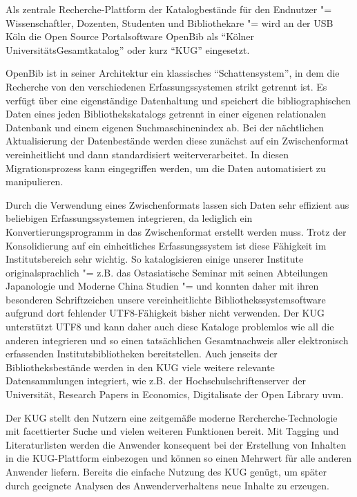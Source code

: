 \documentclass[11pt]{scrartcl}
\begin{document}
Als zentrale Recherche-Plattform der Katalogbestände für den Endnutzer
"= Wissenschaftler, Dozenten, Studenten und Bibliothekare "= wird an
der USB Köln die Open Source Portalsoftware OpenBib\cite{Flimm:2007}
als "`Kölner UniversitätsGesamtkatalog"' oder kurz "`KUG"' eingesetzt.

OpenBib ist in seiner Architektur ein klassisches "`Schattensystem"',
in dem die Recherche von den verschiedenen Erfassungssystemen strikt
getrennt ist. Es verfügt über eine eigenständige Datenhaltung und
speichert die bibliographischen Daten eines jeden Bibliothekskatalogs
getrennt in einer eigenen relationalen Datenbank und einem eigenen
Suchmaschinenindex ab. Bei der nächtlichen Aktualisierung der
Datenbestände werden diese zunächst auf ein Zwischenformat
vereinheitlicht und dann standardisiert weiterverarbeitet. In diesen
Migrationsprozess kann eingegriffen werden, um die Daten automatisiert
zu manipulieren.

Durch die Verwendung eines Zwischenformats lassen sich Daten sehr
effizient aus beliebigen Erfassungssystemen integrieren, da lediglich
ein Konvertierungsprogramm in das Zwischenformat erstellt werden muss.
Trotz der Konsolidierung auf ein einheitliches Erfassungssystem ist
diese Fähigkeit im Institutsbereich sehr wichtig. So katalogisieren
einige unserer Institute originalsprachlich "= z.B. das Ostasiatische
Seminar mit seinen Abteilungen Japanologie und Moderne China Studien
"= und konnten daher mit ihren besonderen Schriftzeichen unsere
vereinheitlichte Bibliothekssystemsoftware aufgrund dort fehlender
UTF8-Fähigkeit bisher nicht verwenden. Der KUG unterstützt UTF8 und
kann daher auch diese Kataloge problemlos wie all die anderen
integrieren und so einen tatsächlichen Gesamtnachweis aller
elektronisch erfassenden Institutsbibliotheken bereitstellen. Auch
jenseits der Bibliotheksbestände werden in den KUG viele weitere
relevante Datensammlungen integriert, wie z.B. der
Hochschulschriftenserver der Universität, Research Papers in
Economics, Digitalisate der Open Library uvm.

Der KUG stellt den Nutzern eine zeitgemäße moderne
Rercherche-Technologie mit facettierter Suche und vielen weiteren
Funktionen bereit. Mit Tagging und Literaturlisten werden die Anwender
konsequent bei der Erstellung von Inhalten in die KUG-Plattform
einbezogen und können so einen Mehrwert für alle anderen Anwender
liefern. Bereits die einfache Nutzung des KUG genügt, um später durch
geeignete Analysen des Anwenderverhaltens neue Inhalte zu erzeugen.
\end{document}
